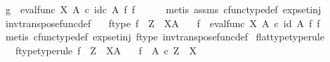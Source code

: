 \begin{isabellebody}
\ {\isachardoublequoteopen}g\ {\isacharequal}{\kern0pt}\ eval{\isacharunderscore}{\kern0pt}func\ X\ A\ {\isasymcirc}\isactrlsub c\ id\isactrlsub c\ A\ {\isasymtimes}\isactrlsub f\ f{\isachardoublequoteclose}\isanewline
\ \ \ \ \isamarkupfalse%
\ {\isacharparenleft}{\kern0pt}metis\ assms\ cfunc{\isacharunderscore}{\kern0pt}type{\isacharunderscore}{\kern0pt}def\ exp{\isacharunderscore}{\kern0pt}set{\isacharunderscore}{\kern0pt}inj{\isacharparenright}{\kern0pt}\isanewline
{}\isamarkupfalse%
%
\endisatagproof
{\isafoldproof}%
%
\isadelimproof
\isanewline
%
\endisadelimproof
\isanewline
{}\isamarkupfalse%
\ inv{\isacharunderscore}{\kern0pt}transpose{\isacharunderscore}{\kern0pt}func{\isacharunderscore}{\kern0pt}def{}{\isacharcolon}{\kern0pt}\isanewline
\ \ \ f{\isacharunderscore}{\kern0pt}type{\isacharcolon}{\kern0pt}\ {\isachardoublequoteopen}f\ {\isacharcolon}{\kern0pt}\ Z\ {\isasymrightarrow}\ X\isactrlbsup A\isactrlesup {\isachardoublequoteclose}\isanewline
\ \ \ {\isachardoublequoteopen}f\isactrlsup {\isasymflat}\ {\isacharequal}{\kern0pt}\ {\isacharparenleft}{\kern0pt}eval{\isacharunderscore}{\kern0pt}func\ X\ A{\isacharparenright}{\kern0pt}\ {\isasymcirc}\isactrlsub c\ {\isacharparenleft}{\kern0pt}id\ A\ {\isasymtimes}\isactrlsub f\ f{\isacharparenright}{\kern0pt}{\isachardoublequoteclose}\isanewline
%
\isadelimproof
\ \ %
\endisadelimproof
%
\isatagproof
{}\isamarkupfalse%
\ {\isacharparenleft}{\kern0pt}metis\ cfunc{\isacharunderscore}{\kern0pt}type{\isacharunderscore}{\kern0pt}def\ exp{\isacharunderscore}{\kern0pt}set{\isacharunderscore}{\kern0pt}inj\ f{\isacharunderscore}{\kern0pt}type\ inv{\isacharunderscore}{\kern0pt}transpose{\isacharunderscore}{\kern0pt}func{\isacharunderscore}{\kern0pt}def{}{\isacharparenright}{\kern0pt}%
\endisatagproof
{\isafoldproof}%
%
\isadelimproof
\isanewline
%
\endisadelimproof
\isanewline
{}\isamarkupfalse%
\ flat{\isacharunderscore}{\kern0pt}type{\isacharbrackleft}{\kern0pt}type{\isacharunderscore}{\kern0pt}rule{\isacharbrackright}{\kern0pt}{\isacharcolon}{\kern0pt}\isanewline
\ \ \ f{\isacharunderscore}{\kern0pt}type{\isacharbrackleft}{\kern0pt}type{\isacharunderscore}{\kern0pt}rule{\isacharbrackright}{\kern0pt}{\isacharcolon}{\kern0pt}\ {\isachardoublequoteopen}f\ {\isacharcolon}{\kern0pt}\ Z\ {\isasymrightarrow}\ X\isactrlbsup A\isactrlesup {\isachardoublequoteclose}\isanewline
\ \ \ {\isachardoublequoteopen}f\isactrlsup {\isasymflat}\ {\isacharcolon}{\kern0pt}\ A\ {\isasymtimes}\isactrlsub c\ Z\ {\isasymrightarrow}\ X{\isachardoublequoteclose}\isanewline

\end{isabellebody}
